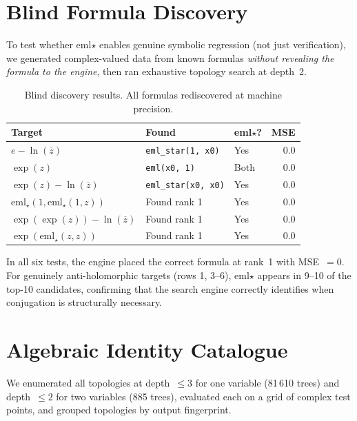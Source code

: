 \documentclass[11pt,a4paper]{article}
\begin{document}
\section{Blind Formula Discovery}
\label{sec:discovery}

To test whether eml$\star$ enables genuine symbolic regression (not just
verification), we generated complex-valued data from known formulas
\emph{without revealing the formula to the engine}, then ran exhaustive
topology search at depth~2.

\begin{table}[h]
\centering
\caption{Blind discovery results. All formulas rediscovered at machine precision.}
\label{tab:discovery}
\begin{tabular}{lllr}
\hline
\textbf{Target} & \textbf{Found} & \textbf{eml$\star$?} & \textbf{MSE} \\
\hline
$e - \ln(\overline{z})$  & \texttt{eml\_star(1, x0)} & Yes & $0.0$ \\
$\exp(z)$                & \texttt{eml(x0, 1)}      & Both & $0.0$ \\
$\exp(z)-\ln(\overline{z})$ & \texttt{eml\_star(x0, x0)} & Yes & $0.0$ \\
$\text{eml}_\star(1,\text{eml}_\star(1,z))$ & Found rank 1 & Yes & $0.0$ \\
$\exp(\exp(z))-\ln(\overline{z})$ & Found rank 1 & Yes & $0.0$ \\
$\exp(\text{eml}_\star(z,z))$ & Found rank 1 & Yes & $0.0$ \\
\hline
\end{tabular}
\end{table}

In all six tests, the engine placed the correct formula at rank~1 with MSE~$=0$.
For genuinely anti-holomorphic targets (rows 1, 3--6), eml$\star$ appears in
9--10 of the top-10 candidates, confirming that the search engine correctly
identifies when conjugation is structurally necessary.

\section{Algebraic Identity Catalogue}
\label{sec:identities}

We enumerated all topologies at depth~$\leq 3$ for one variable (81\,610 trees)
and depth~$\leq 2$ for two variables (885 trees), evaluated each on a grid of
complex test points, and grouped topologies by output fingerprint.
\end{document}
